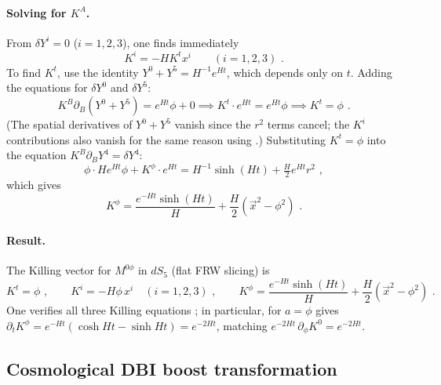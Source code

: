 \documentclass[11pt]{article}
\begin{document}
\paragraph{Solving for $K^A$.}
From $\delta Y^i = 0$ ($i = 1,2,3$), one finds immediately
\begin{equation}
\label{eq:ki-result}
K^i = -H K^t x^i \qquad (i = 1,2,3) \,\,.
\end{equation}
To find $K^t$, use the identity $Y^0 + Y^5 = H^{-1}e^{Ht}$, which depends only on $t$.
Adding the equations for $\delta Y^0$ and $\delta Y^5$:
\begin{equation}
K^B\partial_B(Y^0 + Y^5) = e^{Ht}\phi + 0 \implies K^t \cdot e^{Ht} = e^{Ht}\phi \implies K^t = \phi \,\,.
\end{equation}
(The spatial derivatives of $Y^0 + Y^5$ vanish since the $r^2$ terms cancel; the $K^i$ contributions
also vanish for the same reason using .)  Substituting $K^t = \phi$ into the equation
$K^B\partial_B Y^4 = \delta Y^4$:
\begin{equation}
\phi \cdot He^{Ht}\phi + K^\phi \cdot e^{Ht}
= H^{-1}\sinh(Ht) + \tfrac{H}{2}e^{Ht}r^2 \,\,,
\end{equation}
which gives
\begin{equation}
\label{eq:kphi-result}
K^\phi = \frac{e^{-Ht}\sinh(Ht)}{H} + \frac{H}{2}\!\left(\vec{x}^2 - \phi^2\right) \,\,.
\end{equation}

\paragraph{Result.}
The Killing vector for $M^{0\phi}$ in $dS_5$ (flat FRW slicing) is
\begin{equation}
\label{eq:temporal-killing}
K^t = \phi \,\,, \qquad
K^i = -H\phi\, x^i \quad (i=1,2,3) \,\,, \qquad
K^\phi = \frac{e^{-Ht}\sinh(Ht)}{H} + \frac{H}{2}\!\left(\vec{x}^2 - \phi^2\right) \,\,.
\end{equation}
One verifies all three Killing equations ; in particular,  for $a = \phi$
gives $\partial_t K^\phi = e^{-Ht}(\cosh Ht - \sinh Ht) = e^{-2Ht}$, matching
$e^{-2Ht}\,\partial_\phi K^0 = e^{-2Ht}$.

\subsection{Cosmological DBI boost transformation}
\end{document}
